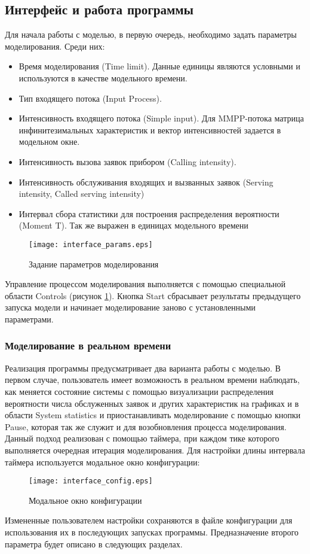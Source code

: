 \subsection{Интерфейс и работа программы}
Для начала работы с моделью, в первую очередь, необходимо задать параметры моделирования. Среди них:
\begin{itemize}
	\item Время моделирования (Time limit). Данные единицы являются условными и используются в качестве модельного времени.
	\item Тип входящего потока (Input Process).
	\item Интенсивность входящего потока (Simple input). Для MMPP-потока матрица инфинитезимальных характеристик и вектор интенсивностей задается в модельном окне.
	\item Интенсивность вызова заявок прибором (Calling intensity).
	\item Интенсивность обслуживания входящих и вызванных заявок (Serving intensity, Called serving intensity)
	\item Интервал сбора статистики для построения распределения вероятности (Moment T). Так же выражен в единицах модельного времени
\end{itemize}
   \begin{figure}[H]
	\centering
	\texttt{[image: interface\_params.eps]}
	\caption{Задание параметров моделирования}
	\label{interface_params}
\end{figure}
Управление процессом моделирования выполняется с помощью специальной области Controls (рисунок \ref{interface_params}). Кнопка Start сбрасывает результаты предыдущего запуска модели и начинает моделирование заново с установленными параметрами.
\subsubsection{Моделирование в реальном времени}
Реализация программы предусматривает два варианта работы с моделью. В первом случае, пользователь имеет возможность в реальном времени наблюдать, как меняется состояние системы с помощью визуализации распределения вероятности числа обслуженных заявок и других характеристик на графиках и в области System statistics и приостанавливать моделирование с помощью кнопки Pause, которая так же служит и для возобновления процесса моделирования. Данный подход реализован с помощью таймера, при каждом тике которого выполняется очередная итерация моделирования. Для настройки длины интервала таймера используется модальное окно конфигурации:
\begin{figure}[H]
	\centering
	\texttt{[image: interface\_config.eps]}
	\caption{Модальное окно конфигурации}
	\label{interface_config}
\end{figure}
Измененные пользователем настройки сохраняются в файле конфигурации для использования их в последующих запусках программы. Предназначение второго параметра будет описано в следующих разделах.

